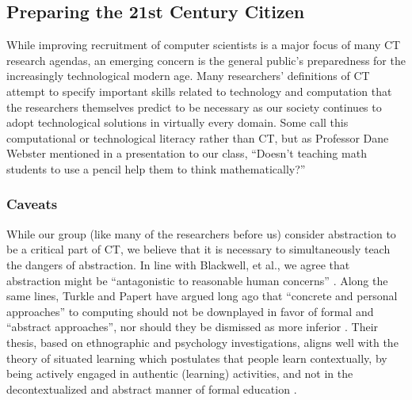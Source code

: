 \documentclass{acm_proc_article-sp}
\begin{document}
\subsection{Preparing the 21st Century Citizen}
While improving recruitment of computer scientists is a major focus of many CT research agendas, an emerging concern is the general public's preparedness for the increasingly technological modern age. Many researchers' definitions of CT attempt to specify important skills related to technology and computation that the researchers themselves predict to be necessary as our society continues to adopt technological solutions in virtually every domain. Some call this computational or technological literacy rather than CT, but as Professor Dane Webster mentioned in a presentation to our class, ``Doesn{'}t teaching math students to use a pencil help them to think mathematically?''

\subsubsection{Caveats}
While our group (like many of the researchers before us) consider abstraction to be a critical part of CT, we believe that it is necessary to simultaneously teach the dangers of abstraction. In line with Blackwell, et al., we agree that abstraction might be ``antagonistic to reasonable human concerns'' \cite{blackwell2008abstract}. Along the same lines, Turkle and Papert have argued long ago that ``concrete and personal approaches'' to computing should not be downplayed in favor of formal and ``abstract approaches'', nor should they be dismissed as more inferior \cite{turkle1990epistemological}. Their thesis, based on ethnographic and psychology investigations, aligns well with the theory of situated learning which postulates that people learn contextually, by being actively engaged in authentic (learning) activities, and not in the decontextualized and abstract manner of formal education \cite{brown1989situated}.


\end{document}
